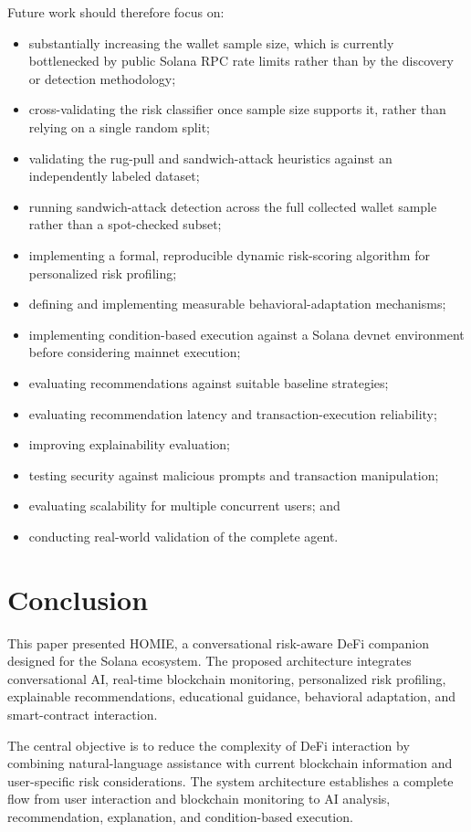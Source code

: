 \documentclass[conference]{IEEEtran}
\begin{document}
Future work should therefore focus on:
\begin{itemize}
    \item substantially increasing the wallet sample size, which is currently bottlenecked by public Solana RPC rate limits rather than by the discovery or detection methodology;
    \item cross-validating the risk classifier once sample size supports it, rather than relying on a single random split;
    \item validating the rug-pull and sandwich-attack heuristics against an independently labeled dataset;
    \item running sandwich-attack detection across the full collected wallet sample rather than a spot-checked subset;
    \item implementing a formal, reproducible dynamic risk-scoring algorithm for personalized risk profiling;
    \item defining and implementing measurable behavioral-adaptation mechanisms;
    \item implementing condition-based execution against a Solana devnet environment before considering mainnet execution;
    \item evaluating recommendations against suitable baseline strategies;
    \item evaluating recommendation latency and transaction-execution reliability;
    \item improving explainability evaluation;
    \item testing security against malicious prompts and transaction manipulation;
    \item evaluating scalability for multiple concurrent users; and
    \item conducting real-world validation of the complete agent.
\end{itemize}

\section{Conclusion}

This paper presented HOMIE, a conversational risk-aware DeFi companion designed for the Solana ecosystem. The proposed architecture integrates conversational AI, real-time blockchain monitoring, personalized risk profiling, explainable recommendations, educational guidance, behavioral adaptation, and smart-contract interaction.

The central objective is to reduce the complexity of DeFi interaction by combining natural-language assistance with current blockchain information and user-specific risk considerations. The system architecture establishes a complete flow from user interaction and blockchain monitoring to AI analysis, recommendation, explanation, and condition-based execution.
\end{document}
